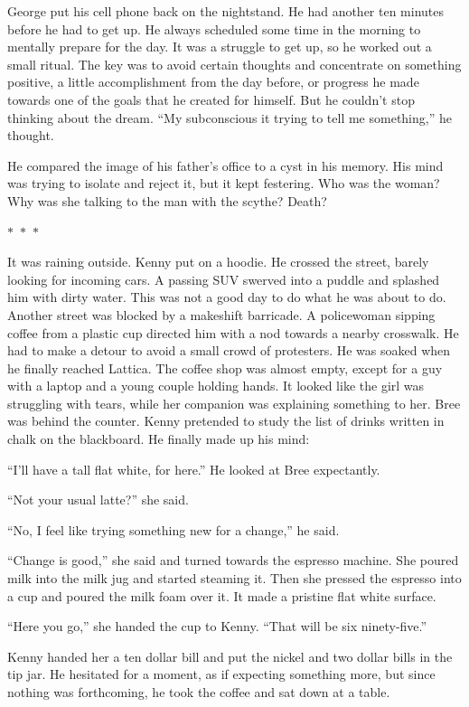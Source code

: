 \documentclass{memoir}
\newcommand{\starbreak}{%
\begin{center}
  $\ast$~$\ast$~$\ast$
\end{center}
}
\begin{document}
George put his cell phone back on the nightstand. He had another ten minutes before he had to get up. He always scheduled some time in the morning to mentally prepare for the day. It was a struggle to get up, so he worked out a small ritual. The key was to avoid certain thoughts and concentrate on something positive, a little accomplishment from the day before, or progress he made towards one of the goals that he created for himself. But he couldn't stop  thinking about the dream. ``My subconscious it trying to tell me something,'' he thought. 

He compared the image of his father's office to a cyst in his memory. His mind was trying to isolate and reject it, but it kept festering. Who was the woman? Why was she talking to the man with the scythe? Death?


\starbreak

It was raining outside. Kenny put on a hoodie. He crossed the street, barely looking for incoming cars. A passing SUV swerved into a puddle and splashed him with dirty water. This was not a good day to do what he was about to do. Another street was blocked by a makeshift barricade. A policewoman sipping coffee from a plastic cup directed him with a nod towards a nearby crosswalk. He had to make a detour to avoid a small crowd of protesters. He was soaked when he finally reached Lattica. The coffee shop was almost empty, except for a guy with a laptop and a young couple holding hands. It looked like the girl was struggling with tears, while her companion was explaining something to her. Bree was behind the counter. Kenny pretended to study the list of drinks written in chalk on the blackboard. He finally made up his mind:

``I'll have a tall flat white, for here.'' He looked at Bree expectantly.

``Not your usual latte?'' she said.

``No, I feel like trying something new for a change,'' he said.

``Change is good,'' she said and turned towards the espresso machine. She poured milk into the milk jug and started steaming it. Then she pressed the espresso into a cup and poured the milk foam over it. It made a pristine flat white surface. 

``Here you go,'' she handed the cup to Kenny. ``That will be six ninety-five.''

Kenny handed her a ten dollar bill and put the nickel and two dollar bills in the tip jar. He hesitated for a moment, as if expecting something more, but since nothing was forthcoming, he took the coffee and sat down at a table. 
\end{document}
